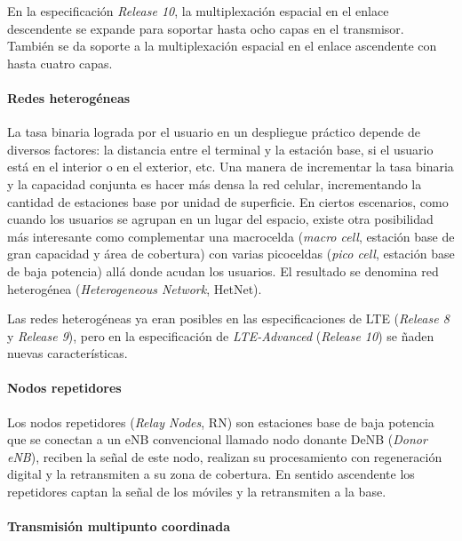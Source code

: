 \documentclass[12pt]{report} %
\begin{document}
En la especificación \textit{Release 10}, la multiplexación espacial en el enlace descendente se expande para soportar hasta ocho capas en el transmisor.
También se da soporte a la multiplexación espacial en el enlace ascendente con hasta cuatro capas.
\cite{RefWorks:39}

\paragraph{Redes heterogéneas}

La tasa binaria lograda por el usuario en un despliegue práctico depende de diversos factores:
la distancia entre el terminal y la estación base, si el usuario está en el interior o en el exterior, etc.
Una manera de incrementar la tasa binaria y la capacidad conjunta es hacer más densa la red celular, incrementando la cantidad de estaciones base por unidad de superficie.
En ciertos escenarios, como cuando los usuarios se agrupan en un lugar del espacio, existe otra posibilidad más interesante como complementar una macrocelda (\textit{macro cell}, estación base de gran capacidad y área de cobertura) con varias picoceldas (\textit{pico cell}, estación base de baja potencia) allá donde acudan los usuarios.
El resultado se denomina red heterogénea (\textit{Heterogeneous Network}, HetNet).
\cite{RefWorks:39, RefWorks:26}

Las redes heterogéneas ya eran posibles en las especificaciones de LTE (\textit{Release 8} y \textit{Release 9}), pero en la especificación de \textit{LTE-Advanced} (\textit{Release 10}) se ñaden nuevas características.
\cite{RefWorks:39}

\paragraph{Nodos repetidores}

Los nodos repetidores (\textit{Relay Nodes}, RN) son estaciones base de baja potencia que se conectan a un eNB convencional llamado nodo donante DeNB (\textit{Donor eNB}), reciben la señal de este nodo, realizan su procesamiento con regeneración digital y la retransmiten a su zona de cobertura.
En sentido ascendente los repetidores captan la señal de los móviles y la retransmiten a la base.
\cite{RefWorks:81, RefWorks:39}

\paragraph{Transmisión multipunto coordinada}
\end{document}
